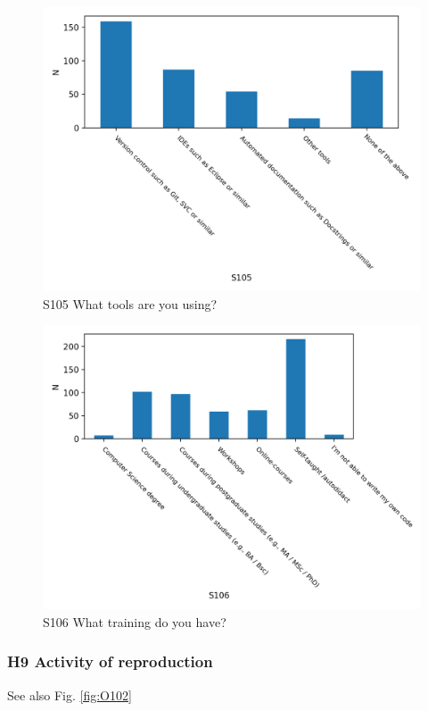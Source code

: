 \documentclass{article}
\begin{document}
\begin{figure}[!p]
    \centering
    \includegraphics[width=\textwidth]{../figs/S105.png}
	\caption{S105 What tools are you using?}
    \label{fig:S105}
\end{figure}

\begin{figure}[!p]
    \centering
    \includegraphics[width=\textwidth]{../figs/S106.png}
	\caption{S106 What training do you have?}
    \label{fig:S106}
\end{figure}


\newpage



\newpage
\subsubsection{H9 Activity of reproduction}
See also Fig. \ref{fig:O102}
\end{document}
